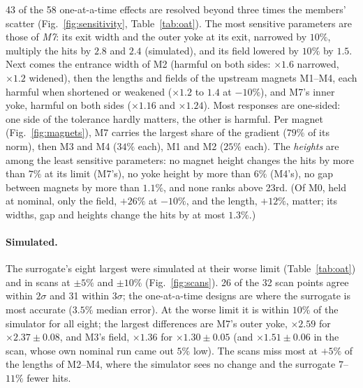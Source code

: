 \documentclass[11pt,a4paper]{article}
\begin{document}
43 of the 58 one-at-a-time effects are resolved beyond three times the members' scatter
(Fig.~\ref{fig:sensitivity}, Table~\ref{tab:oat}). The most sensitive parameters are those of
\emph{M7}: its exit width and the outer yoke at its exit, narrowed by $10\%$, multiply the hits by
$2.8$ and $2.4$ (simulated), and its field lowered by $10\%$ by $1.5$. Next comes the entrance
width of M2 (harmful on both sides: $\times1.6$ narrowed, $\times1.2$ widened), then the lengths
and fields of the upstream magnets M1--M4, each harmful when shortened or weakened ($\times1.2$ to
$1.4$ at $-10\%$), and M7's inner yoke, harmful on both sides ($\times1.16$ and $\times1.24$). Most
responses are one-sided: one side of the tolerance hardly matters, the other is harmful. Per magnet
(Fig.~\ref{fig:magnets}), M7 carries the largest share of the gradient ($79\%$ of its norm), then
M3 and M4 ($34\%$ each), M1 and M2 ($25\%$ each). The \emph{heights} are among the least
sensitive parameters: no magnet height changes the hits by more than $7\%$ at its limit (M7's), no
yoke height by more than $6\%$ (M4's), no gap between magnets by more than $1.1\%$, and none ranks
above 23rd. (Of M0, held at nominal, only the field, $+26\%$ at $-10\%$, and the length,
$+12\%$, matter; its widths, gap and heights change the hits by at most $1.3\%$.)

\paragraph{Simulated.} The surrogate's eight largest were simulated at their worse limit
(Table~\ref{tab:oat}) and in scans at $\pm5\%$ and $\pm10\%$ (Fig.~\ref{fig:scans}). 26 of the 32
scan points agree within $2\sigma$ and 31 within $3\sigma$; the one-at-a-time designs are where
the surrogate is most accurate ($3.5\%$ median error). At the worse limit it is within $10\%$ of
the simulator for all eight; the largest differences are M7's outer yoke, $\times2.59$ for
$\times2.37\pm0.08$, and M3's field, $\times1.36$ for $\times1.30\pm0.05$ (and $\times1.51\pm0.06$
in the scan, whose own nominal run came out $5\%$ low). The scans miss most at $+5\%$ of the
lengths of M2--M4, where the simulator sees no change and the surrogate $7$--$11\%$ fewer hits.
\end{document}
